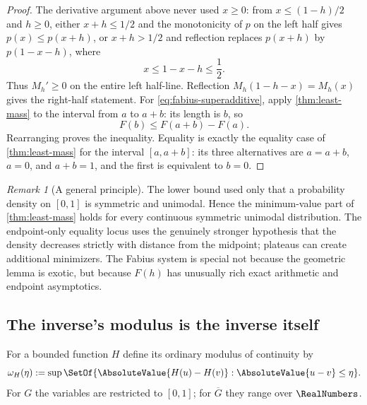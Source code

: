 \documentclass[11pt,oneside]{article}
\theoremstyle{definition}
\theoremstyle{remark}
\newtheorem{remark}[theorem]{Remark}
\numberwithin{equation}{section}
\newcommand{\InvT}{\overline G}
\begin{document}
\begin{proof}
The derivative argument above never used $x\ge0$: from
$x\le(1-h)/2$ and $h\ge0$, either $x+h\le1/2$ and the monotonicity of $p$ on
the left half gives $p(x)\le p(x+h)$, or $x+h>1/2$ and reflection replaces
$p(x+h)$ by $p(1-x-h)$, where
\[
 x\le1-x-h\le\frac12.
\]
Thus $M_h'\ge0$ on the entire left half-line.  Reflection
$M_h(1-h-x)=M_h(x)$ gives the right-half statement.  For
\eqref{eq:fabius-superadditive}, apply \cref{thm:least-mass} to the interval
from $a$ to $a+b$: its length is $b$, so
\[
 F(b)\le F(a+b)-F(a).
\]
 Rearranging proves the inequality.  Equality is exactly the equality case of
 \cref{thm:least-mass} for the interval $[a,a+b]$: its three alternatives are
 $a=a+b$, $a=0$, and $a+b=1$, and the first is equivalent to $b=0$.
\end{proof}

\begin{remark}[A general principle]\label{rem:general-principle}
The lower bound used only that a probability density on $[0,1]$ is symmetric
and unimodal.  Hence the minimum-value part of \cref{thm:least-mass} holds for
every continuous symmetric unimodal distribution.  The endpoint-only equality
locus uses the genuinely stronger hypothesis that the density decreases
strictly with distance from the midpoint; plateaus can create additional
minimizers.  The Fabius system is special not because the geometric lemma is
exotic, but because $F(h)$ has unusually rich exact arithmetic and endpoint
asymptotics.
\end{remark}

\subsection{The inverse's modulus is the inverse itself}

For a bounded function $H$ define its ordinary modulus of continuity by
\begin{equation}\label{eq:ordinary-modulus}
 \omega_H(\eta):=
 \sup\SetOf{\AbsoluteValue{H(u)-H(v)}:\AbsoluteValue{u-v}\le\eta}.
\end{equation}
For $G$ the variables are restricted to $[0,1]$; for $\InvT$ they range over
$\RealNumbers$.
\end{document}
